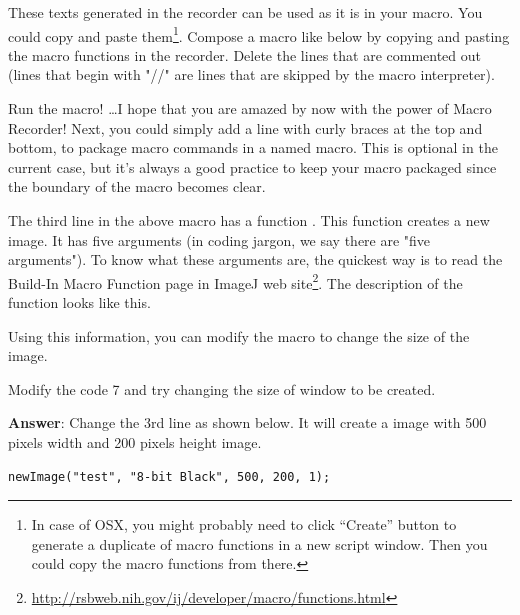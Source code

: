 These texts generated in the recorder can be used as it is in your macro.  You could copy and paste them\footnote{In case of OSX, you might probably need to click ``Create'' button to generate a duplicate of macro functions in a new script window. Then you could copy the macro functions from there.}. Compose a macro like below by copying and pasting the macro functions in the recorder.  Delete the lines that are commented out (lines that begin with "//" are lines that are skipped by the macro interpreter).


Run the macro! \ldots I hope that you are amazed by now with the power of Macro
Recorder! Next, you could simply add a line with curly braces at the top and bottom, to package macro commands in a named macro. This is optional in the current case, but it's always a good practice to keep your macro packaged since the boundary of the macro becomes clear. 
 


The third line in the above macro has a function . This
function creates a new image. It has five arguments (in coding jargon, we say
there are "five arguments"). To know what these arguments are, 
the quickest way is to read the Build-In Macro Function page in ImageJ web site\footnote{\url{http://rsbweb.nih.gov/ij/developer/macro/functions.html}}.  
The description of the function  looks like this. 

\begin{indentCom}

\end{indentCom}
Using this information, you can modify the macro to change the size of the image.

\begin{indentexercise}{1}
Modify the code 7 and try changing the size of window to be created.

\item \textbf{Answer}: Change the 3rd line as shown below. It will create a image with 500 pixels width and 200 pixels height image.  
	\begin{lstlisting}[numbers=none]
		newImage("test", "8-bit Black", 500, 200, 1);
	\end{lstlisting}
\end{indentexercise}

